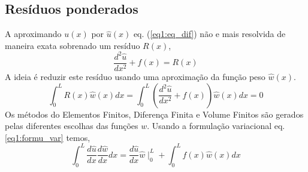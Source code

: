 \subsection{Resíduos ponderados}
%
A aproximando $u(x)$ por $\hat u(x)$ eq. (\ref{eq1:eq_dif}) não e mais resolvida de maneira exata sobrenado um resíduo $R(x)$,
%
\begin{equation}
	\frac{d^2 \hat u}{dx^2} + f(x) = R(x)
\end{equation}
%
A ideia é reduzir este resíduo usando uma aproximação da função peso $\hat w(x)$.
%
\begin{equation}
	\int_0^L R(x) \hat w(x) dx=  \int_0^L\left( \frac{d^2\hat u}{dx^2} + f(x) \right) \hat w(x) dx = 0
\end{equation}
%
Os métodos do Elementos Finitos, Diferença Finita e Volume Finitos são gerados pelas diferentes escolhas das funções $w$. Usando a formulação variacional eq. \ref{eq1:formu_var} temos,
%
\begin{equation}
	\int_0^L \frac{d \hat u}{dx} \frac{d \hat w}{dx} dx  =  	\frac{d \hat u}{dx} \hat w \mid_0^L + \int_0^L f(x) \hat w(x) dx
	\label{eq1:Residuo_ponderados}
\end{equation}
%
